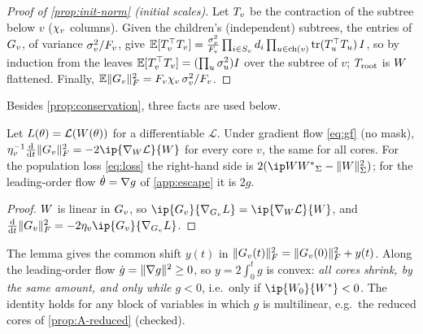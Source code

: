 \begin{proof}[Proof of \cref{prop:init-norm} (initial scales)]
  Let $\Sub{v}$ be the contraction of the subtree below $v$ ($\bd{v}$ columns). Given the children's
  (independent) subtrees, the entries of $\G{v}$, of variance $\iscv{v}^2/\fanin{v}$, give
  $\E[\Sub{v}\T\Sub{v}]=\frac{\iscv{v}^2}{\fanin{v}}\prod_{i\in\sites{v}}\pd[i]\prod_{u\in\ch{v}}
  \tr(\Sub{u}\T\Sub{u})\,\Id$, so by induction from the leaves
  $\E[\Sub{v}\T\Sub{v}]=(\prod_{u}\iscv{u}^2)\Id$ over the subtree of $v$; $\Sub{\vroot}$ is $\W$
  flattened. Finally, $\E\normF{\G{v}}^2=\fanin{v}\bd{v}\,\iscv{v}^2/\fanin{v}$.
\end{proof}

Besides \cref{prop:conservation}, three facts are used below.

\begin{lemma}\label{lem:A-norm-shift}
  \proven{} 
  Let $\Loss(\params)=\mathcal L(\W(\params))$ for a differentiable $\mathcal L$. Under gradient flow \eqref{eq:gf} (no
  mask), $\lrm{v}^{-1}\ddt\normF{\G{v}}^2=-2\ip{\nabla_{\W}\mathcal L}{\W}$ for every core $v$, the same for all cores. For the
  population loss \eqref{eq:loss} the right-hand side is $2(\ipS{\W}{\Wt}-\normS{\W}^2)$; for the leading-order
  flow $\dot\params=\nabla g$ of \cref{app:escape} it is $2g$.
\end{lemma}
\begin{proof}
  $\W$ is linear in $\G{v}$, so $\ip{\G{v}}{\nabla_{\G{v}}\Loss}=\ip{\nabla_{\W}\mathcal L}{\W}$, and
  $\ddt\normF{\G{v}}^2=-2\lrm{v}\ip{\G{v}}{\nabla_{\G{v}}\Loss}$.
\end{proof}

The lemma gives the common shift $y(t)$ in $\normF{\G{v}(t)}^2=\normF{\G{v}(0)}^2+y(t)$. Along the leading-order
flow $\dot g=\norm{\nabla g}^2\ge0$, so $y=2\int_0^tg$ is convex: \emph{all cores shrink, by the same amount,
and only while $g<0$}, i.e.\ only if $\ip{\Wz}{\Wt}<0$. The identity holds for any block of variables in
which $g$ is multilinear, e.g.\ the reduced cores of \cref{prop:A-reduced} (checked).


